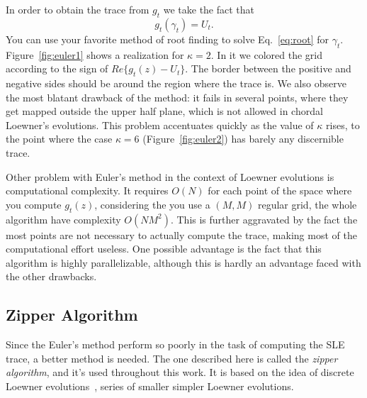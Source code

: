 In order to obtain the trace from $g_t$ we take the fact that
\begin{equation}
    g_t(\gamma_t) = U_t.
    \label{eq:root}
\end{equation}
You can use your favorite method of root finding to solve Eq.~\ref{eq:root} for
$\gamma_t$. Figure~\ref{fig:euler1} shows a realization for $\kappa=2$. In it
we colored the grid according to the sign of $Re\{g_t(z)-U_t\}$. The border
between the positive and negative sides should be around the region where the
trace is. We also observe the most blatant drawback of the method: it fails in
several points, where they get mapped outside the upper half plane, which is
not allowed in chordal Loewner's evolutions. This problem accentuates quickly
as the value of $\kappa$ rises, to the point where the case $\kappa=6$
(Figure~\ref{fig:euler2}) has barely any discernible trace.

Other problem with Euler's method in the context of Loewner evolutions is
computational complexity. It requires $O(N)$ for each point of the space where
you compute $g_t(z)$, considering the you use a $(M,M)$ regular grid, the whole
algorithm have complexity $O(NM^2)$. This is further aggravated by the fact the
most points are not necessary to actually compute the trace, making most of the
computational effort useless. One possible advantage is the fact that this
algorithm is highly parallelizable, although this is hardly an advantage faced
with the other drawbacks.

\subsection{Zipper Algorithm}
\label{ss:zipper}

Since the Euler's method perform so poorly in the task of computing the SLE
trace, a better method is needed. The one described here is called the
\textit{zipper algorithm}, and it's used throughout this work. It is based on
the idea of discrete Loewner evolutions~\cite{Bauer2003, Kennedy2009}, series
of smaller simpler Loewner evolutions.

